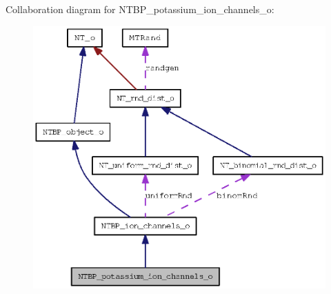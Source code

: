 Collaboration diagram for NTBP\_\-potassium\_\-ion\_\-channels\_\-o:
\nopagebreak
\begin{figure}[H]
\begin{center}
\leavevmode
\includegraphics[width=385pt]{class_n_t_b_p__potassium__ion__channels__o__coll__graph}
\end{center}
\end{figure}
